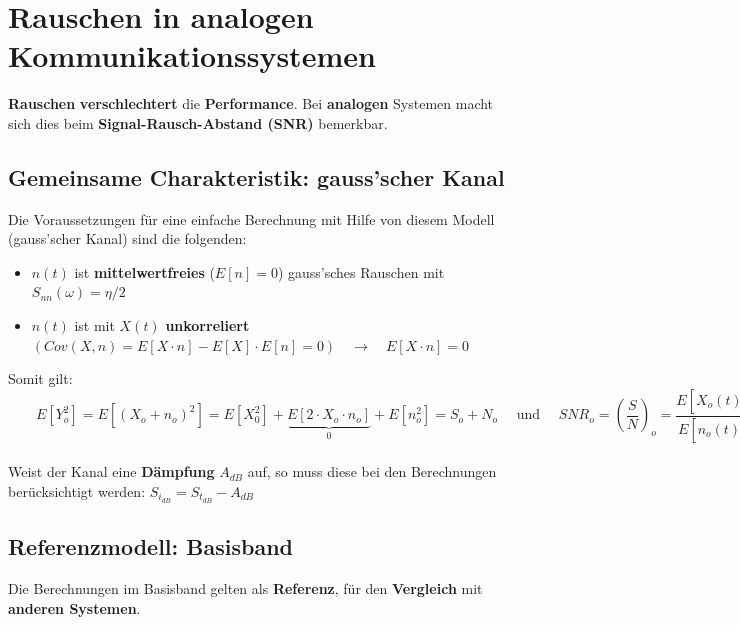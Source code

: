 \section{Rauschen in analogen Kommunikationssystemen }
\textbf{Rauschen} \textbf{verschlechtert} die \textbf{Performance}. Bei \textbf{analogen} Systemen
macht sich dies beim \textbf{Signal-Rausch-Abstand (SNR)} bemerkbar.
\subsection{Gemeinsame Charakteristik: gauss'scher Kanal}
\begin{figure}[!ht]
\begin{center}
	
\end{center}
\end{figure}

Die Voraussetzungen für eine einfache Berechnung mit Hilfe von diesem Modell (gauss'scher Kanal)
sind die folgenden:
\begin{itemize}
  \item $n(t)$ ist \textbf{mittelwertfreies} ($E[n] = 0$) gauss'sches Rauschen mit $S_{nn}(\omega) = \eta/2$
  \item $n(t)$ ist mit $X \left( t \right)$ \textbf{unkorreliert} $\left( Cov
  \left(X,n \right) = E \left[ X \cdot n \right] - E \left[ X \right] \cdot E
  \left[ n \right] = 0 \right) \quad \rightarrow \quad E[X\cdot n] = 0$
\end{itemize}
Somit gilt: $ \qquad E[Y_o^2]= E[(X_o + n_o)^2] = E[X_0^2] + \underbrace{E[2 \cdot X_o \cdot n_o]}_0 + E[n_o^2] = S_o + N_o
\quad \text{ und } \quad SNR_o = \left(\dfrac{S}{N}\right)_o = \dfrac{E[X_o(t)^2]}{E[n_o(t)^2]}$ \\ \\
Weist der Kanal eine \textbf{Dämpfung} $A_{dB}$ auf, so muss diese bei den Berechnungen berücksichtigt
werden: $S_{i_{dB}} = S_{t_{dB}} - A_{dB}$



\subsection{Referenzmodell: Basisband }
Die Berechnungen im Basisband gelten als \textbf{Referenz}, für den \textbf{Vergleich} mit
\textbf{anderen Systemen}. \\

\begin{figure}[!ht]
\begin{center}
	
\end{center}
\end{figure}

